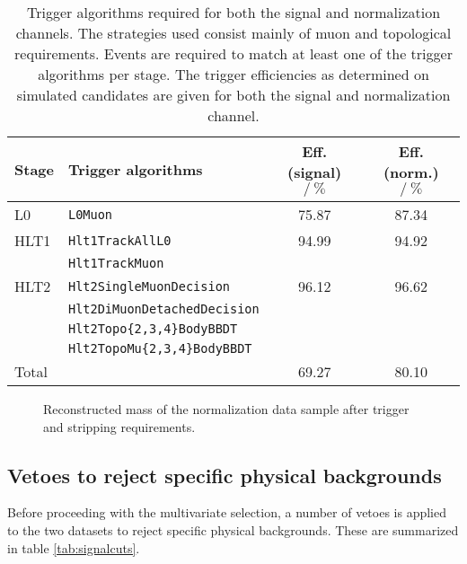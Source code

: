 \begin{table}
  \centering
  \caption{
    Trigger algorithms required for both the signal and normalization channels.
    The strategies used consist mainly of muon and topological requirements.
    Events are required to match at least one of the trigger algorithms per stage.
    The trigger efficiencies as determined on simulated candidates are given for both the signal and normalization channel.
  }
  \begin{tabular}{l l S[table-format=2.2,table-figures-uncertainty=1] S[table-format=2.2,table-figures-uncertainty=1]}
    \toprule
    Stage & Trigger algorithms & {Eff. (signal) $/\ \si{\percent}$} & {Eff. (norm.) $/\ \si{\percent}$} \\
    \midrule
    L0   & \texttt{L0Muon} & 75.87  & 87.34  \\ 
    \midrule
    HLT1 & \texttt{Hlt1TrackAllL0} & 94.99  & 94.92  \\ 
         & \texttt{Hlt1TrackMuon} & & \\ 
    \midrule
    HLT2 & \texttt{Hlt2SingleMuonDecision} & 96.12  & 96.62  \\ 
         & \texttt{Hlt2DiMuonDetachedDecision} & & \\ 
         & \texttt{Hlt2Topo\{2,3,4\}BodyBBDT} & & \\ 
         & \texttt{Hlt2TopoMu\{2,3,4\}BodyBBDT} & & \\ 
    \midrule
    Total & & 69.27  & 80.10  \\
    \bottomrule
  \end{tabular}
  \label{tab:trigger}
\end{table}

\begin{figure}
  \centering
  {}
  \caption{
    Reconstructed \PBzero mass of the normalization data sample after trigger and stripping requirements.
  }
  \label{fig:bmass}
\end{figure}

\subsection{Vetoes to reject specific physical backgrounds}

Before proceeding with the multivariate selection, a number of vetoes is applied to the two datasets to reject specific physical backgrounds.
These are summarized in table \ref{tab:signalcuts}.

